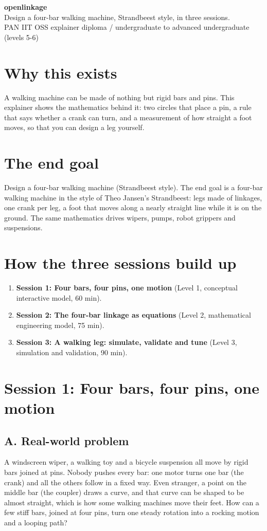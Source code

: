 \documentclass[11pt,a4paper]{article}
\begin{document}
\begin{center}{\LARGE\bfseries openlinkage}\\[0.4em]{\large Design a four-bar walking machine, Strandbeest style, in three sessions.}\\[0.2em]\small PAN IIT OSS explainer \textbullet{} diploma / undergraduate to advanced undergraduate (levels 5-6)\end{center}

\section*{Why this exists}
A walking machine can be made of nothing but rigid bars and pins. This explainer shows the mathematics behind it: two circles that place a pin, a rule that says whether a crank can turn, and a measurement of how straight a foot moves, so that you can design a leg yourself.

\section*{The end goal}
Design a four-bar walking machine (Strandbeest style). The end goal is a four-bar walking machine in the style of Theo Jansen's Strandbeest: legs made of linkages, one crank per leg, a foot that moves along a nearly straight line while it is on the ground. The same mathematics drives wipers, pumps, robot grippers and suspensions.

\section*{How the three sessions build up}
\begin{enumerate}[nosep]
\item \textbf{Session 1: Four bars, four pins, one motion} (Level 1, conceptual interactive model, 60 min).
\item \textbf{Session 2: The four-bar linkage as equations} (Level 2, mathematical engineering model, 75 min).
\item \textbf{Session 3: A walking leg: simulate, validate and tune} (Level 3, simulation and validation, 90 min).
\end{enumerate}

\section{Session 1: Four bars, four pins, one motion}

\subsection*{A. Real-world problem}
A windscreen wiper, a walking toy and a bicycle suspension all move by rigid bars joined at pins. Nobody pushes every bar: one motor turns one bar (the crank) and all the others follow in a fixed way. Even stranger, a point on the middle bar (the coupler) draws a curve, and that curve can be shaped to be almost straight, which is how some walking machines move their feet. How can a few stiff bars, joined at four pins, turn one steady rotation into a rocking motion and a looping path?
\end{document}

